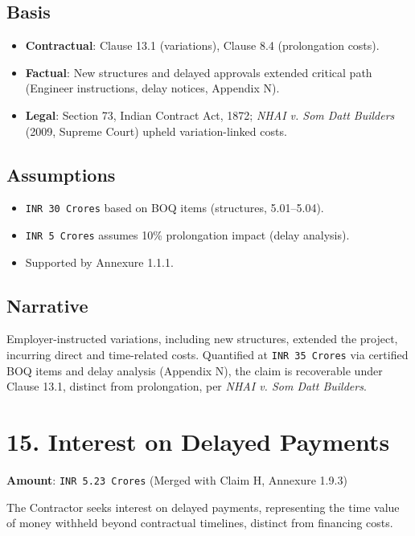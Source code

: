 \documentclass[12pt,letterpaper]{article}
\begin{document}
	\subsection*{Basis}
	\begin{itemize}
		\item \textbf{Contractual}: Clause 13.1 (variations), Clause 8.4 (prolongation costs).
		\item \textbf{Factual}: New structures and delayed approvals extended critical path (Engineer instructions, delay notices, Appendix N).
		\item \textbf{Legal}: Section 73, Indian Contract Act, 1872; \textit{NHAI v. Som Datt Builders} (2009, Supreme Court) upheld variation-linked costs.
	\end{itemize}
	
	\subsection*{Assumptions}
	\begin{itemize}
		\item \texttt{INR 30 Crores} based on BOQ items (structures, 5.01--5.04).
		\item \texttt{INR 5 Crores} assumes 10\% prolongation impact (delay analysis).
		\item Supported by Annexure 1.1.1.
	\end{itemize}
	
	\subsection*{Narrative}
	Employer-instructed variations, including new structures, extended the project, incurring direct and time-related costs. Quantified at \texttt{INR 35 Crores} via certified BOQ items and delay analysis (Appendix N), the claim is recoverable under Clause 13.1, distinct from prolongation, per \textit{NHAI v. Som Datt Builders}.
	
	\section*{15. Interest on Delayed Payments}
	\textbf{Amount}: \texttt{INR 5.23 Crores} (Merged with Claim H, Annexure 1.9.3)
	
	The Contractor seeks interest on delayed payments, representing the time value of money withheld beyond contractual timelines, distinct from financing costs.
	
\end{document}
